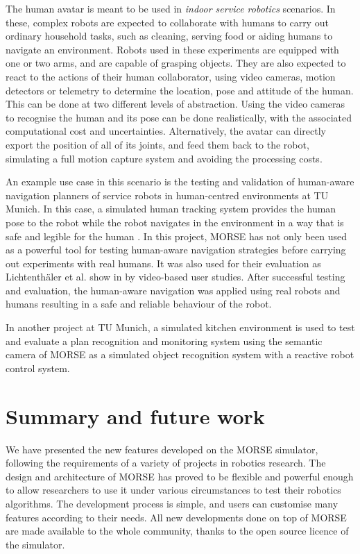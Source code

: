 \documentclass{llncs}
\newcommand{\serge}[1]{\nb{Serge}{blue}{#1}}
\begin{document}
The human avatar is meant to be used in \emph{indoor service robotics} scenarios.
In these, complex robots are expected to collaborate with humans to carry out
ordinary household tasks, such as cleaning, serving food or aiding humans to
navigate an environment.
Robots used in these experiments are equipped with one or two arms, and are
capable of grasping objects. They are also expected to react to the actions of
their human collaborator, using video cameras, motion detectors or telemetry to
determine the location, pose and attitude of the human.
This can be done at two different levels of
abstraction. Using the video cameras to recognise the human and its pose can be
done realistically, with the associated computational cost and uncertainties.
Alternatively, the avatar can directly export the position of all of its
joints, and feed them back to the robot, simulating a full motion capture
system and avoiding the processing costs.


An example use case in this scenario is the testing and validation of human-aware
navigation planners of service robots in human-centred environments at TU Munich.
In this case, a simulated human tracking system provides the human pose to the
robot while the robot navigates in the environment in a way that is safe and
legible for the human \cite{kruse10exploiting}. In this project, MORSE has not only been used as a
powerful tool for testing human-aware navigation strategies before carrying out
experiments with real humans. It was also used for their evaluation as
Lichtenth{\"a}ler et al. show in \cite{lichtenthaeler2012increasing} by
video-based user studies. After successful testing and evaluation, the
human-aware navigation was applied using real robots and humans resulting in
a safe and reliable behaviour of the robot.

In another project at TU Munich, a simulated kitchen environment is used
to test and evaluate a plan recognition and monitoring system using the
semantic camera of MORSE as a simulated object recognition system with
a reactive robot control system.


\section{Summary and future work}
\label{section:discussion}

We have presented the new features developed on the MORSE simulator,
following the requirements of a variety of projects in robotics research.
The design and architecture of MORSE has proved to be flexible and powerful
enough to allow researchers to use it under various circumstances to test their
robotics algorithms. The development process is simple, and users can customise
many features according to their needs.
\serge{Why the dev process is simple ?}
All new developments done on top of MORSE are made available to the whole
community, thanks to the open source licence of the simulator.
\end{document}
